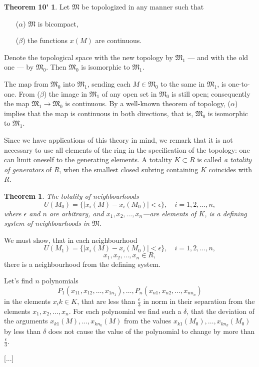 \documentclass{article}
\newtheorem{theorem}{Theorem}
\theoremstyle{definition}
\begin{document}
\newtheorem*{theorem10'}{Theorem 10'}
\begin{theorem10'}
  Let $\mathfrak{M}$ be topologized in any manner such that
  \begin{enumerate}
  \item [($\alpha$)] $\mathfrak{M}$ is bicompact,
  \item [($\beta$)] the functions $x(M)$ are continuous.
  \end{enumerate}
  Denote the topological space with the new topology by $\mathfrak{M_1}$ --- and with the old one --- by $\mathfrak{M_0}$. Then $\mathfrak{M_0}$ is isomorphic to $\mathfrak{M_1}$.
\end{theorem10'}
The map from $\mathfrak{M_0}$ into $\mathfrak{M_1}$, sending each $M\in\mathfrak{M_0}$ to the same in $\mathfrak{M_1}$, is one-to-one. From ($\beta$) the image in $\mathfrak{M_1}$ of any open set in $\mathfrak{M_0}$ is still open; consequently the map $\mathfrak{M_1}\to\mathfrak{M_0}$ is continuous. By a well-known theorem of topology, ($\alpha$) implies that the map is continuous in both directions, that is, $\mathfrak{M_0}$ is isomorphic to $\mathfrak{M_1}$.

Since we have applications of this theory in mind, we remark that it is not necessary to use all elements of the ring in the specification of the topology: one can limit oneself to the generating elements. A totality $K\subset R$ is called \emph{a totality of generators} of $R$, when the smallest closed subring containing $K$ coincides with $R$.

\begin{theorem}
  The totality of neighbourhoods
  $$ U(M_0) = \{|x_i(M) - x_i(M_0)| < \epsilon\},\quad i=1,2,\dots,n, $$
  where $\epsilon$ and $n$ are arbitrary, and $x_1, x_2, \dots, x_n$---are elements of $K$, is a defining system of neighbourhoods in $\mathfrak{M}$.
\end{theorem}

We must show, that in each neighbourhood
$$ U(M_1) = \{|x_i(M) - x_i(M_0)| < \epsilon\},\quad i=1,2,\dots,n, $$
$$ x_1, x_2, \dots, x_n\in R, $$
there is a neighbourhood from the defining system.

Let's find $n$ polynomials
$$ P_1(x_{11}, x_{12}, \dots, x_{1n_1}), \dots, P_n(x_{n1}, x_{n2}, \dots, x_{nn_n}) $$
in the elements $x_ik\in K$, that are less than $\frac\epsilon3$ in norm in their separation from the elements $x_1, x_2, \dots, x_n$. For each polynomial we find such a $\delta$, that the deviation of the arguments $x_{k1}(M), \dots, x_{kn_k}(M)$ from the values $x_{k1}(M_0), \dots, x_{kn_k}(M_0)$ by less than $\delta$ does not cause the value of the polynomial to change by more than $\frac\epsilon3$.

[...]
\end{document}
